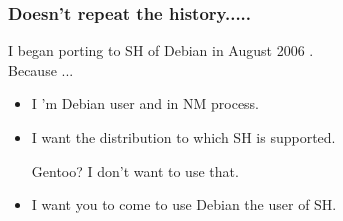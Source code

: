 \documentclass[cjk,dvipdfm,12pt]{beamer}
\begin{document}
\begin{frame}
 \frametitle{Doesn't repeat the history.....}

  I began porting to SH of Debian in August 2006 .\\
  Because ...
  \begin{itemize}
    \item I 'm Debian user and in NM process.
    \item I want the distribution to which SH is supported.

	Gentoo? I don't want to use that.
    \item I want you to come to use Debian the user of SH.
  \end{itemize}
\end{frame}

%	
%
%
\end{document}

